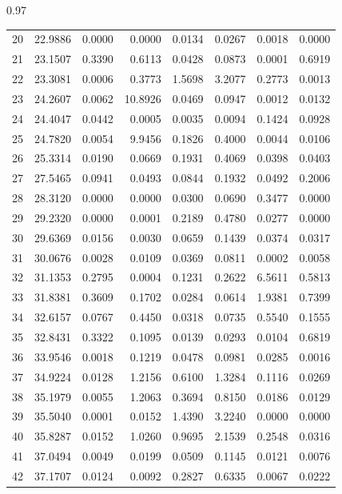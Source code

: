 \documentclass[../Thesis-IJspeert.tex]{subfiles}
\begin{document}
\begin{spacing}{0.97}
\begin{small}
\begin{longtable}{crrrrrrr}
			20 & 22.9886 & 0.0000 & 0.0000 & 0.0134 & 0.0267 & 0.0018 & 0.0000 \\  
			21 & 23.1507 & 0.3390 & 0.6113 & 0.0428 & 0.0873 & 0.0001 & 0.6919 \\  
			22 & 23.3081 & 0.0006 & 0.3773 & 1.5698 & 3.2077 & 0.2773 & 0.0013 \\  
			23 & 24.2607 & 0.0062 & 10.8926 & 0.0469 & 0.0947 & 0.0012 & 0.0132 \\  
			24 & 24.4047 & 0.0442 & 0.0005 & 0.0035 & 0.0094 & 0.1424 & 0.0928 \\  
			25 & 24.7820 & 0.0054 & 9.9456 & 0.1826 & 0.4000 & 0.0044 & 0.0106 \\  
			26 & 25.3314 & 0.0190 & 0.0669 & 0.1931 & 0.4069 & 0.0398 & 0.0403 \\  
			27 & 27.5465 & 0.0941 & 0.0493 & 0.0844 & 0.1932 & 0.0492 & 0.2006 \\  
			28 & 28.3120 & 0.0000 & 0.0000 & 0.0300 & 0.0690 & 0.3477 & 0.0000 \\  
			29 & 29.2320 & 0.0000 & 0.0001 & 0.2189 & 0.4780 & 0.0277 & 0.0000 \\  
			30 & 29.6369 & 0.0156 & 0.0030 & 0.0659 & 0.1439 & 0.0374 & 0.0317 \\  
			31 & 30.0676 & 0.0028 & 0.0109 & 0.0369 & 0.0811 & 0.0002 & 0.0058 \\  
			32 & 31.1353 & 0.2795 & 0.0004 & 0.1231 & 0.2622 & 6.5611 & 0.5813 \\  
			33 & 31.8381 & 0.3609 & 0.1702 & 0.0284 & 0.0614 & 1.9381 & 0.7399 \\  
			34 & 32.6157 & 0.0767 & 0.4450 & 0.0318 & 0.0735 & 0.5540 & 0.1555 \\  
			35 & 32.8431 & 0.3322 & 0.1095 & 0.0139 & 0.0293 & 0.0104 & 0.6819 \\  
			36 & 33.9546 & 0.0018 & 0.1219 & 0.0478 & 0.0981 & 0.0285 & 0.0016 \\  
			37 & 34.9224 & 0.0128 & 1.2156 & 0.6100 & 1.3284 & 0.1116 & 0.0269 \\  
			38 & 35.1979 & 0.0055 & 1.2063 & 0.3694 & 0.8150 & 0.0186 & 0.0129 \\  
			39 & 35.5040 & 0.0001 & 0.0152 & 1.4390 & 3.2240 & 0.0000 & 0.0000 \\  
			40 & 35.8287 & 0.0152 & 1.0260 & 0.9695 & 2.1539 & 0.2548 & 0.0316 \\  
			41 & 37.0494 & 0.0049 & 0.0199 & 0.0509 & 0.1145 & 0.0121 & 0.0076 \\  
			42 & 37.1707 & 0.0124 & 0.0092 & 0.2827 & 0.6335 & 0.0067 & 0.0222 \\  

\end{longtable}
\end{small}
\end{spacing}
\end{document}
